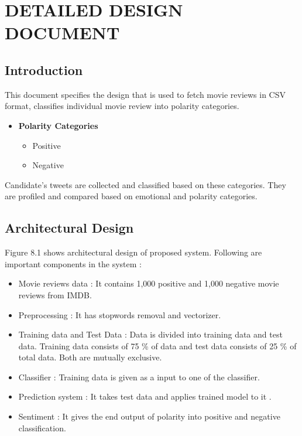 \documentclass[oneside,a4paper,12pt]{pictreport}
\begin{document}
\chapter{DETAILED DESIGN DOCUMENT}

\section{Introduction}
This document specifies the design that is used to fetch movie reviews in CSV format, classifies individual movie review into polarity categories.
\begin{itemize}
 


    \item \textbf{Polarity Categories}
    \begin{itemize}
    \item Positive
    \item Negative
   
    \end{itemize}
\end{itemize}
Candidate's tweets are collected and classified based on these categories. They are profiled and compared based on emotional and polarity categories.
\newpage
\section{Architectural Design}
Figure 8.1 shows architectural design of proposed system. Following are important components in the system :
\begin{itemize}
\item Movie reviews data : It contains 1,000 positive and 1,000 negative movie reviews from IMDB.
\item Preprocessing : It has stopwords removal and vectorizer.
\item Training data and Test Data : Data is divided into training data and test data. Training data consists of 75 \%
of data and test data consists of 25 \% of total data. Both are mutually exclusive.
\item Classifier : Training data is given as a input to one of the classifier.
\item Prediction system : It takes test data and applies trained model to it .
\item Sentiment : It gives the end output of polarity into positive and negative classification.   
\end{itemize}
\end{document}
